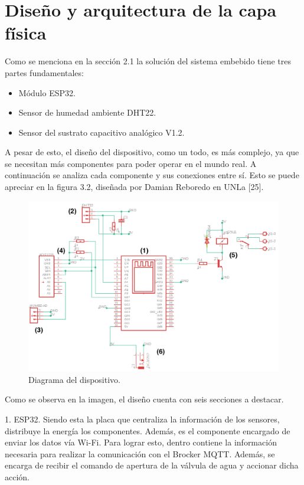 \section{Diseño y arquitectura de la capa física}
Como se menciona en la sección 2.1 la solución del sistema embebido tiene tres partes fundamentales:
\begin{itemize}
\item Módulo ESP32.
\item Sensor de humedad ambiente DHT22.
\item Sensor del sustrato capacitivo analógico V1.2.
\end{itemize}
A pesar de esto, el diseño del dispositivo, como un todo, es más complejo, ya que se necesitan más componentes para poder operar en el mundo real. A continuación se analiza cada componente y sus conexiones entre sí. Esto se puede apreciar en la figura 3.2, diseñada por Damian Reboredo en UNLa [25].


\begin{figure}[htpb]
\centering 
\includegraphics[width=.9\textwidth]{./Figures/diagDipos.png}
\caption{Diagrama del dispositivo.}
\label{fig:diagBloques}
\end{figure}

Como se observa en la imagen, el diseño cuenta con seis secciones a destacar.

1. ESP32. Siendo esta la placa que centraliza la información de los sensores, distribuye la energía los componentes. Además, es el componente encargado de enviar los datos vía Wi-Fi. Para lograr esto, dentro contiene la información necesaria para realizar la comunicación con el Brocker MQTT. Además, se encarga de recibir el comando de apertura de la válvula de agua y accionar dicha acción.

